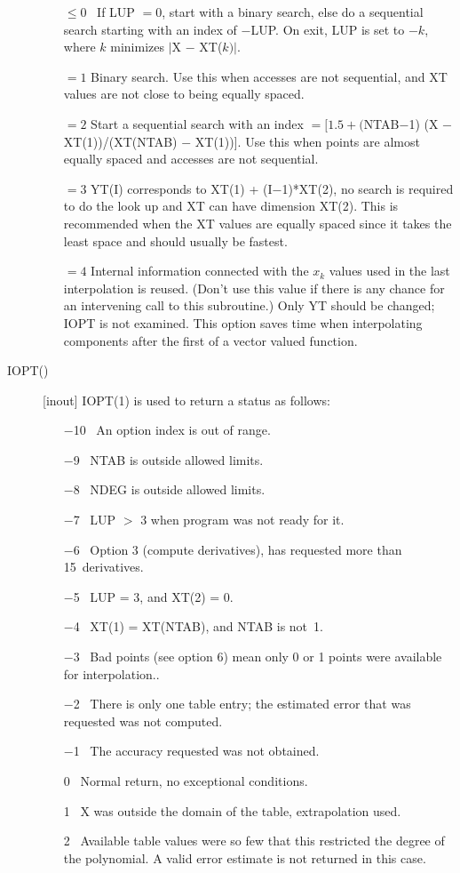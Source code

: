 \documentclass[twoside]{MATH77}
\begin{document}
\begin{description}
\begin{itemize}
\item[$\leq 0$]  \ If LUP $=0$, start with a binary search, else do a
sequential search starting with an index of $-$LUP. On exit, LUP is set to $%
-k$, where $k$ minimizes $|$X $-$ XT($k)|.$
\item[$= 1$]  Binary search. Use this when accesses are not sequential, and
XT values are not close to being equally spaced.
\item[$= 2$]  Start a sequential search with an index $=[1.5+($NTAB$-$1)
(X $-$ XT(1))/(XT(NTAB) $-$ XT(1))]. Use this when points are almost equally
spaced and accesses are not sequential.
\item[$= 3$]  YT(I) corresponds to XT(1) + (I$-$1)*XT(2), no search is
required to do the look up and XT can have dimension XT(2). This is
recommended when the XT values are equally spaced since it takes the least
space and should usually be fastest.
\item[$= 4$]  Internal information connected with the $x_k$ values used in
the last interpolation is reused. (Don't use this value if there is any
chance for an intervening call to this subroutine.) Only YT should be
changed; IOPT is not examined. This option saves time when interpolating
components after the first of a vector valued function.
\end{itemize}

\item[IOPT()]  [inout] IOPT(1) is used to return a status as follows:

\begin{itemize}
\item[$-$10 ]  \ An option index is out of range.
\item[$-$9 ]  \ NTAB is outside allowed limits.
\item[$-$8 ]  \ NDEG is outside allowed limits.
\item[$-$7 ]  \  LUP $>$ 3 when program was not ready for it.
\item[$-$6 ]  \ Option 3 (compute derivatives), has requested more than
15~derivatives.
\item[$-$5 ]  \ LUP = 3, and XT(2) = 0.
\item[$-$4 ]  \ XT(1) = XT(NTAB), and NTAB is not~1.
\item[$-$3 ]  \ Bad points (see option 6) mean only 0 or 1 points were
available for interpolation..
\item[$-$2 ]  \ There is only one table entry; the estimated error that was
requested was not computed.
\item[$-$1 ]  \ The accuracy requested was not obtained.
\item[0 ]  \ Normal return, no exceptional conditions.
\item[1 ]  \ X was outside the domain of the table, extrapolation used.
\item[2 ]  \ Available table values were so few that this restricted the
degree of the polynomial.  A valid error estimate is not returned in this
case.
\end{itemize}


\end{description}
\end{document}
